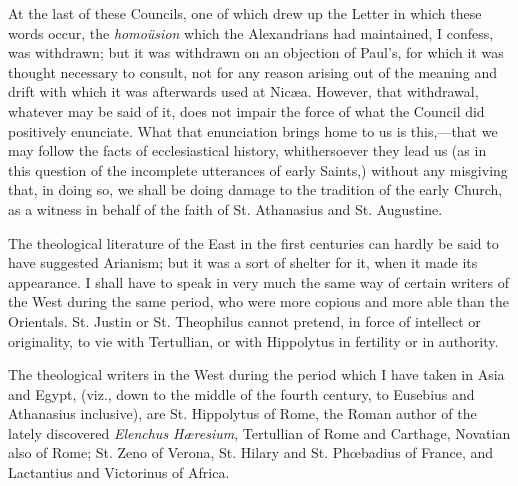 At the last of these Councils, one of which drew up the Letter in
which these words occur, the \emph{homoüsion} which the Alexandrians
had maintained, I confess, was withdrawn; but it was withdrawn on an
objection of Paul's, for which it was thought necessary to consult,
not for any reason arising out of the meaning and drift with which it
was afterwards used at Nicæa. However, that withdrawal, whatever may
be said of it, does not impair the force of what the Council did
positively enunciate. What that enunciation brings home to us is this,—that
we may follow the facts of ecclesiastical history, whithersoever they
lead us (as in this question of the incomplete utterances of early
Saints,) without any misgiving that, in doing so, we shall be doing
damage to the tradition of the early Church, as a witness in behalf of
the faith of St. Athanasius and St. Augustine.


The theological literature of the East in the first centuries
can hardly be said to have suggested Arianism; but it was a sort of
shelter for it, when it made its appearance. I shall have to speak in
very much the same way of certain writers of the West during the same
period, who were more copious and more able than the Orientals. St.
Justin or St. Theophilus cannot pretend, in force of intellect or
originality, to vie with Tertullian, or with Hippolytus in fertility
or in authority.

The theological writers in the West during the period which I have
taken in Asia and Egypt, (viz., down to the middle of the fourth
century, to Eusebius and Athanasius inclusive), are St. Hippolytus of
Rome, the Roman author of the lately discovered \emph{Elenchus Hæresium},
Tertullian of Rome and Carthage, Novatian also of Rome; St. Zeno of
Verona, St. Hilary and St. Phœbadius of France, and Lactantius and
Victorinus of Africa.

